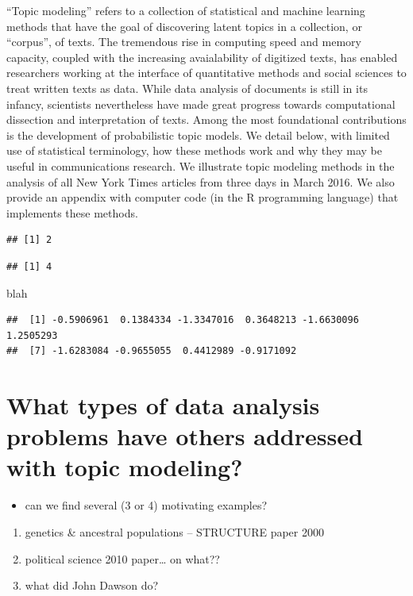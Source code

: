 \documentclass[12pt,]{article}
\providecommand{\tightlist}{%
  \setlength{\itemsep}{0pt}\setlength{\parskip}{0pt}}
\begin{document}
``Topic modeling'' refers to a collection of statistical and machine
learning methods that have the goal of discovering latent topics in a
collection, or ``corpus'', of texts. The tremendous rise in computing
speed and memory capacity, coupled with the increasing avaialability of
digitized texts, has enabled researchers working at the interface of
quantitative methods and social sciences to treat written texts as data.
While data analysis of documents is still in its infancy, scientists
nevertheless have made great progress towards computational dissection
and interpretation of texts. Among the most foundational contributions
is the development of probabilistic topic models. We detail below, with
limited use of statistical terminology, how these methods work and why
they may be useful in communications research. We illustrate topic
modeling methods in the analysis of all New York Times articles from
three days in March 2016. We also provide an appendix with computer code
(in the R programming language) that implements these methods.

\begin{verbatim}
## [1] 2
\end{verbatim}

\begin{verbatim}
## [1] 4
\end{verbatim}

blah

\begin{verbatim}
##  [1] -0.5906961  0.1384334 -1.3347016  0.3648213 -1.6630096  1.2505293
##  [7] -1.6283084 -0.9655055  0.4412989 -0.9171092
\end{verbatim}

\section{What types of data analysis problems have others addressed with
topic
modeling?}\label{what-types-of-data-analysis-problems-have-others-addressed-with-topic-modeling}

\begin{itemize}
\tightlist
\item
  can we find several (3 or 4) motivating examples?
\end{itemize}

\begin{enumerate}
\def\labelenumi{\arabic{enumi}.}
\tightlist
\item
  genetics \& ancestral populations -- STRUCTURE paper 2000
\item
  political science 2010 paper\ldots{} on what??
\item
  what did John Dawson do?
\end{enumerate}
\end{document}
